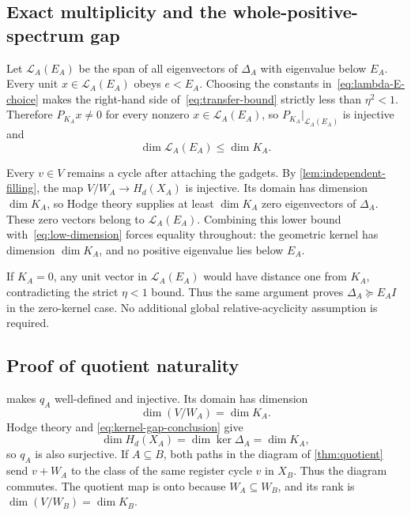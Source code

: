 \subsection{Exact multiplicity and the whole-positive-spectrum gap}

Let \(\mathcal L_A(E_A)\) be the span of all eigenvectors of \(\Delta_A\) with eigenvalue below \(E_A\). Every unit \(x\in\mathcal L_A(E_A)\) obeys \(e<E_A\). Choosing the constants in~\cref{eq:lambda-E-choice} makes the right-hand side of~\cref{eq:transfer-bound} strictly less than \(\eta^2<1\). Therefore \(P_{K_A}x\neq0\) for every nonzero \(x\in\mathcal L_A(E_A)\), so \(P_{K_A}|_{\mathcal L_A(E_A)}\) is injective and
\begin{equation}
\label{eq:low-dimension}
\dim\mathcal L_A(E_A)\le\dim K_A.
\end{equation}

Every \(v\in V\) remains a cycle after attaching the gadgets. By \cref{lem:independent-filling}, the map \(V/W_A\to H_d(X_A)\) is injective. Its domain has dimension \(\dim K_A\), so Hodge theory supplies at least \(\dim K_A\) zero eigenvectors of \(\Delta_A\). These zero vectors belong to \(\mathcal L_A(E_A)\). Combining this lower bound with~\cref{eq:low-dimension} forces equality throughout: the geometric kernel has dimension \(\dim K_A\), and no positive eigenvalue lies below \(E_A\).

If \(K_A=0\), any unit vector in \(\mathcal L_A(E_A)\) would have distance one from \(K_A\), contradicting the strict \(\eta<1\) bound. Thus the same argument proves \(\Delta_A\succeq E_AI\) in the zero-kernel case. No additional global relative-acyclicity assumption is required.

\subsection{Proof of quotient naturality}
\label{app:quotient-proof}

 makes \(q_A\) well-defined and injective.
Its domain has dimension
\[
\dim(V/W_A)=\dim K_A.
\]
Hodge theory and
\cref{eq:kernel-gap-conclusion} give
\[
\dim H_d(X_A)=\dim\ker\Delta_A=\dim K_A,
\]
so \(q_A\) is also surjective.  If \(A\subseteq B\), both paths in the
diagram of \cref{thm:quotient} send \(v+W_A\) to the class of the same
register cycle \(v\) in \(X_B\).  Thus the diagram commutes.  The quotient
map is onto because \(W_A\subseteq W_B\), and its rank is
\(\dim(V/W_B)=\dim K_B\).
